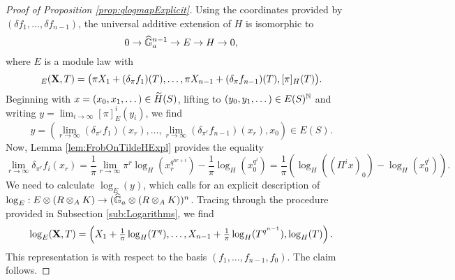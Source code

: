 \documentclass[../main.tex]{subfiles}
\begin{document}
\begin{proof}[Proof of Proposition \ref{prop:qlogmapExplicit}]
  Using the coordinates provided by $(\delta f_1, \dots, \delta f_{n-1})$, the
  universal additive extension of $H$ is isomorphic to 
  \begin{equation*}
    0 \to \GG_a^{n-1} \to E \to H \to 0,
  \end{equation*}
  where $E$ is a module law with 
  \begin{equation*}
    [\pi]_E(\bX, T) = \big(\pi X_1 + (\delta_{\pi}f_1)(T), \dots, \pi X_{n-1} + 
    (\delta_{\pi}f_{n-1})(T), [\pi]_H(T)\big).
  \end{equation*}
  Beginning with $x = (x_0, x_1, \dots) \in \Tilde H (S)$, lifting to $(y_0,
  y_1, \dots) \in E(S)^\N$ 
  and writing $y = \lim_{i\to\infty} [\pi]_E^i (y_i)$, we find
  \begin{equation*}
    y = \left(\lim_{r\to\infty} (\delta_{\pi^r} f_1)(x_r), \dots, \lim_{r\to \infty}
    (\delta_{\pi^r}f_{n-1})(x_r), x_0\right) \in E(S).
  \end{equation*}
  Now, Lemma \ref{lem:FrobOnTildeHExpl} provides the equality
  $$\lim_{r\to\infty}\delta_{\pi^r} f_i(x_r) = \frac 1\pi \lim_{r \to \infty}
  \pi^r \log_H(x_r^{q^{nr+i}}) - \frac 1\pi \log_H\left(x_0^{q^i}\right) = 
  \frac 1\pi \left(\log_H((\Pi^i x)_0)- \log_H(x_0^{q^i})\right).$$
  We need to calculate $\log_E(y)$, which calls for an explicit description of 
  $\log_E : E \otimes (R \otimes_AK) \to (\GG_a \otimes(R \otimes_A K))^n$. 
  Tracing through the procedure provided in Subsection \ref{sub:Logarithms},
  we find
  \begin{equation*}
    \log_E(\bX, T) = \left(X_1 + \tfrac 1\pi \log_H(T^q), \dots, 
    X_{n-1} + \tfrac 1\pi \log_H(T^{q^{n-1}}), \log_H(T)\right).
  \end{equation*}
  This representation is with respect to the basis $(f_1, \dots, f_{n-1}, f_0)$. 
  The claim follows.
\end{proof}



\end{document}
